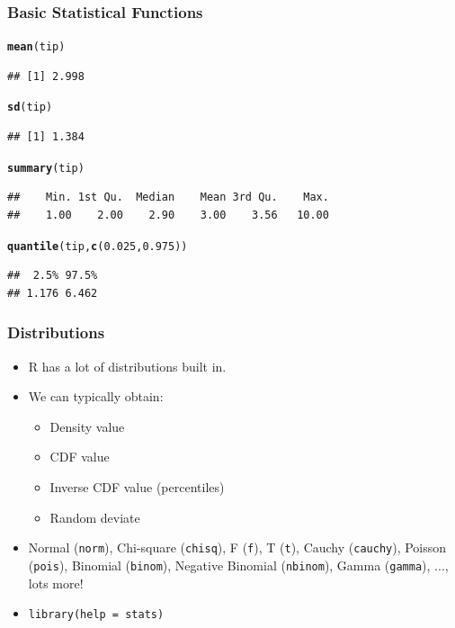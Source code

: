 \documentclass{beamer}\usepackage[]{graphicx}\usepackage[]{color}
\makeatletter
\newcommand{\hlnum}[1]{\textcolor[rgb]{0.686,0.059,0.569}{#1}}%
\newcommand{\hlstd}[1]{\textcolor[rgb]{0.345,0.345,0.345}{#1}}%
\newcommand{\hlkwd}[1]{\textcolor[rgb]{0.737,0.353,0.396}{\textbf{#1}}}%
\newenvironment{kframe}{%
 \def\at@end@of@kframe{}%
 \ifinner\ifhmode%
  \def\at@end@of@kframe{\end{minipage}}%
  \begin{minipage}{\columnwidth}%
 \fi\fi%
 \def\FrameCommand##1{\hskip\@totalleftmargin \hskip-\fboxsep
 \colorbox{shadecolor}{##1}\hskip-\fboxsep
     \hskip-\linewidth \hskip-\@totalleftmargin \hskip\columnwidth}%
 \MakeFramed {\advance\hsize-\width
   \@totalleftmargin\z@ \linewidth\hsize
   \@setminipage}}%
 {\par\unskip\endMakeFramed%
 \at@end@of@kframe}
\newenvironment{knitrout}{}{} %
\makeatother
\begin{document}
\begin{frame}[fragile]
    \frametitle{Basic Statistical Functions}
\begin{knitrout}\footnotesize
{}\color{fgcolor}\begin{kframe}
\begin{alltt}
\hlkwd{mean}\hlstd{(tip)}
\end{alltt}
\begin{verbatim}
## [1] 2.998
\end{verbatim}
\begin{alltt}
\hlkwd{sd}\hlstd{(tip)}
\end{alltt}
\begin{verbatim}
## [1] 1.384
\end{verbatim}
\begin{alltt}
\hlkwd{summary}\hlstd{(tip)}
\end{alltt}
\begin{verbatim}
##    Min. 1st Qu.  Median    Mean 3rd Qu.    Max. 
##    1.00    2.00    2.90    3.00    3.56   10.00
\end{verbatim}
\begin{alltt}
\hlkwd{quantile}\hlstd{(tip,} \hlkwd{c}\hlstd{(}\hlnum{0.025}\hlstd{,} \hlnum{0.975}\hlstd{))}
\end{alltt}
\begin{verbatim}
##  2.5% 97.5% 
## 1.176 6.462
\end{verbatim}
\end{kframe}
\end{knitrout}

\end{frame}

\begin{frame}
    \frametitle{Distributions}
    \begin{itemize}
        \item R has a lot of distributions built in.
        \item We can typically obtain:
        \begin{itemize}
            \item Density value
            \item CDF value
            \item Inverse CDF value (percentiles)
            \item Random deviate
        \end{itemize}
        \item Normal (\texttt{norm}), Chi-square (\texttt{chisq}), F (\texttt{f}), T (\texttt{t}), Cauchy (\texttt{cauchy}), Poisson (\texttt{pois}), Binomial (\texttt{binom}), Negative Binomial (\texttt{nbinom}), Gamma (\texttt{gamma}), ..., lots more!
        \item \texttt{library(help = stats)}
    \end{itemize}
\end{frame}
\end{document}
